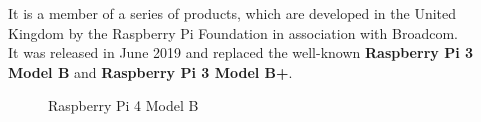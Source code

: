 \documentclass[a4paper, 12pt]{article}
\begin{document}
It is a member of a series of products, which are developed in the United Kingdom by the Raspberry Pi Foundation in association with Broadcom. \\
It  was released in June 2019\cite{Rpi4} and replaced the well-known \textbf{Raspberry Pi 3 Model B} and \textbf{Raspberry Pi 3 Model B+}.

\begin{figure}[h]
    \centering
    \caption{Raspberry Pi 4 Model B}
\end{figure}
\end{document}
